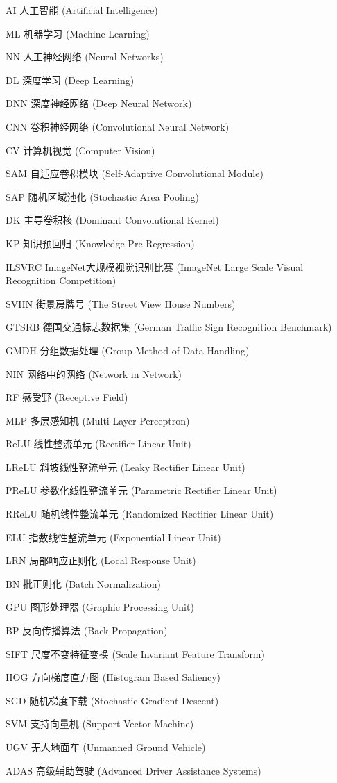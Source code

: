 \begin{denotation}[3cm]
\item[AI] 人工智能 (Artificial Intelligence)
\item[ML] 机器学习 (Machine Learning)
\item[NN] 人工神经网络 (Neural Networks)
\item[DL] 深度学习 (Deep Learning)
\item[DNN] 深度神经网络 (Deep Neural Network)
\item[CNN] 卷积神经网络 (Convolutional Neural Network)
\item[CV] 计算机视觉 (Computer Vision)
\item[SAM] 自适应卷积模块 (Self-Adaptive Convolutional Module)
\item[SAP] 随机区域池化 (Stochastic Area Pooling)
\item[DK] 主导卷积核 (Dominant Convolutional Kernel)
\item[KP] 知识预回归 (Knowledge Pre-Regression)
\item[ILSVRC] ImageNet大规模视觉识别比赛 (ImageNet Large Scale Visual Recognition Competition)
\item[SVHN] 街景房牌号 (The Street View House Numbers)
\item[GTSRB] 德国交通标志数据集 (German Traffic Sign Recognition Benchmark)
\item[GMDH] 分组数据处理 (Group Method of Data Handling)
\item[NIN] 网络中的网络 (Network in Network)
\item[RF] 感受野 (Receptive Field)
\item[MLP] 多层感知机 (Multi-Layer Perceptron)
\item[ReLU] 线性整流单元 (Rectifier Linear Unit)
\item[LReLU] 斜坡线性整流单元 (Leaky Rectifier Linear Unit)
\item[PReLU] 参数化线性整流单元 (Parametric Rectifier Linear Unit)
\item[RReLU] 随机线性整流单元 (Randomized Rectifier Linear Unit)
\item[ELU] 指数线性整流单元 (Exponential Linear Unit)
\item[LRN] 局部响应正则化 (Local Response Unit)
\item[BN] 批正则化 (Batch Normalization)
\item[GPU] 图形处理器 (Graphic Processing Unit)
\item[BP] 反向传播算法 (Back-Propagation)
\item[SIFT] 尺度不变特征变换 (Scale Invariant Feature Transform)
\item[HOG] 方向梯度直方图 (Histogram Based Saliency)
\item[SGD] 随机梯度下载 (Stochastic Gradient Descent)
\item[SVM] 支持向量机 (Support Vector Machine)
\item[UGV] 无人地面车 (Unmanned Ground Vehicle)
\item[ADAS] 高级辅助驾驶 (Advanced Driver Assistance Systems)
\end{denotation}
